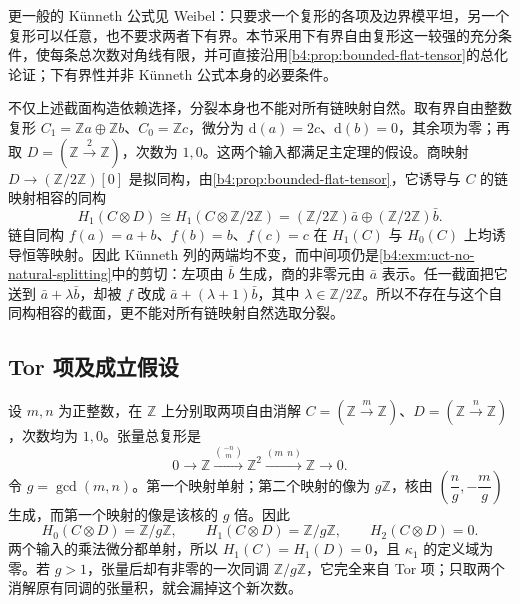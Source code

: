 更一般的 Künneth 公式见 Weibel\cite[Theorem 3.6.3]{Weibel1994HomologicalAlgebra}：只要求一个复形的各项及边界模平坦，另一个复形可以任意，也不要求两者下有界。本节采用下有界自由复形这一较强的充分条件，使每条总次数对角线有限，并可直接沿用\cref{b4:prop:bounded-flat-tensor}的总化论证；下有界性并非 Künneth 公式本身的必要条件。

\ProseParagraphBreak
不仅上述截面构造依赖选择，分裂本身也不能对所有链映射自然。取有界自由整数复形 \(C_1=\mathbb Za\oplus\mathbb Zb\)、\(C_0=\mathbb Zc\)，微分为 \(\mathrm{d}(a)=2c\)、\(\mathrm{d}(b)=0\)，其余项为零；再取 \(D=(\mathbb Z\xrightarrow{2}\mathbb Z)\)，次数为 \(1,0\)。这两个输入都满足主定理的假设。商映射 \(D\to(\mathbb Z/2\mathbb Z)[0]\) 是拟同构，由\cref{b4:prop:bounded-flat-tensor}，它诱导与 \(C\) 的链映射相容的同构
\[
	H_1(C\otimes D)\cong H_1(C\otimes\mathbb Z/2\mathbb Z) =(\mathbb Z/2\mathbb Z)\bar a\oplus(\mathbb Z/2\mathbb Z)\bar b.
\]
链自同构 \(f(a)=a+b\)、\(f(b)=b\)、\(f(c)=c\) 在 \(H_1(C)\) 与 \(H_0(C)\) 上均诱导恒等映射。因此 Künneth 列的两端均不变，而中间项仍是\cref{b4:exm:uct-no-natural-splitting}中的剪切：左项由 \(\bar b\) 生成，商的非零元由 \(\bar a\) 表示。任一截面把它送到 \(\bar a+\lambda\bar b\)，却被 \(f\) 改成 \(\bar a+(\lambda+1)\bar b\)，其中 \(\lambda\in\mathbb Z/2\mathbb Z\)。所以不存在与这个自同构相容的截面，更不能对所有链映射自然选取分裂。

\subsection{Tor 项及成立假设}
\label{b4:subsec:0904:02}

\begin{example}\label{b4:exm:kunneth-two-cyclic}
	设 \(m,n\) 为正整数，在 \(\mathbb Z\) 上分别取两项自由消解 \(C=(\mathbb Z\xrightarrow{m}\mathbb Z)\)、\(D=(\mathbb Z\xrightarrow{n}\mathbb Z)\)，次数均为 \(1,0\)。张量总复形是
	\[
		0\longrightarrow\mathbb Z\xrightarrow{\binom{-n}{m}} \mathbb Z^2\xrightarrow{(m\ \ n)}\mathbb Z\longrightarrow0.
	\]
	令 \(g=\gcd(m,n)\)。第一个映射单射；第二个映射的像为 \(g\mathbb Z\)，核由 \(\left(\dfrac ng,-\dfrac mg\right)\) 生成，而第一个映射的像是该核的 \(g\) 倍。因此
	\[
		H_0(C\otimes D)=\mathbb Z/g\mathbb Z,\qquad H_1(C\otimes D)=\mathbb Z/g\mathbb Z, \qquad H_2(C\otimes D)=0.
	\]
	两个输入的乘法微分都单射，所以 \(H_1(C)=H_1(D)=0\)，且 \(\kappa_1\) 的定义域为零。若 \(g>1\)，张量后却有非零的一次同调 \(\mathbb Z/g\mathbb Z\)，它完全来自 Tor 项；只取两个消解原有同调的张量积，就会漏掉这个新次数。
\end{example}

